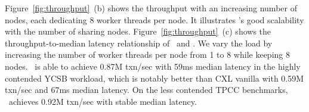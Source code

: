 

Figure~\ref{fig:throughput}~(b) shows the throughput with an increasing number of nodes, each dedicating 8 worker threads per node. It illustrates \name's good scalability with the number of sharing nodes.  
Figure~\ref{fig:throughput}~(c) shows the throughput-to-median latency relationship of \name~and \vanilla. We vary the load by increasing the number of worker threads per node from 1 to 8 while keeping 8 nodes. \name~is able to achieve 0.87M txn/sec with 59ms median latency in the highly contended YCSB workload, which is notably better than CXL vanilla with 0.59M txn/sec and 67ms median latency. On the less contended TPCC benchmarks, \name~achieves 0.92M txn/sec with stable median latency. 

